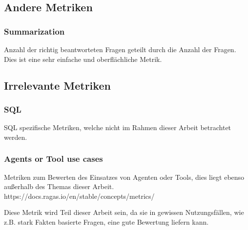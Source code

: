 \subsection{Andere Metriken}
\subsubsection{Summarization}
Anzahl der richtig beantworteten Fragen geteilt durch die Anzahl der Fragen. Dies ist eine sehr einfache und oberflächliche Metrik.


\subsection{Irrelevante Metriken}
\subsubsection{SQL}
SQL spezifische Metriken, welche nicht im Rahmen dieser Arbeit betrachtet werden.

\subsubsection{Agents or Tool use cases}
Metriken zum Bewerten des Einsatzes von Agenten oder Tools, dies liegt ebenso außerhalb des Themas dieser Arbeit.
https://docs.ragas.io/en/stable/concepts/metrics/

Diese Metrik wird Teil dieser Arbeit sein, da sie in gewissen Nutzungsfällen, wie z.B. stark Fakten basierte Fragen, eine gute Bewertung liefern kann.